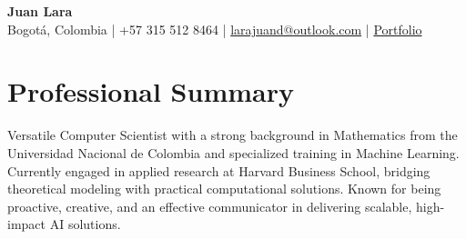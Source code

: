 \documentclass[a4paper,10pt]{article}
\begin{document}
\pagestyle{empty}
\pagecolor{background} %

\begin{center}
    {\Huge\textbf{\textcolor{primary}{Juan Lara}}}\\[0.6em]
    {\small\color{secondary}
        \faMapMarker* Bogotá, Colombia \quad | \quad
        \faMobile* +57 315 512 8464 \quad | \quad
        \faEnvelope \href{mailto:larajuand@outlook.com}{larajuand@outlook.com} \quad | \quad
        \faGlobe \href{https://juanlara18.github.io/Portafolio/}{Portfolio}
    }
\end{center}

\vspace{0.3cm} %

\section{Professional Summary}
\begin{tcolorbox}
Versatile Computer Scientist with a strong background in Mathematics from the Universidad Nacional de Colombia and specialized training in Machine Learning. Currently engaged in applied research at Harvard Business School, bridging theoretical modeling with practical computational solutions. Known for being proactive, creative, and an effective communicator in delivering scalable, high-impact AI solutions.
\end{tcolorbox}
\end{document}
